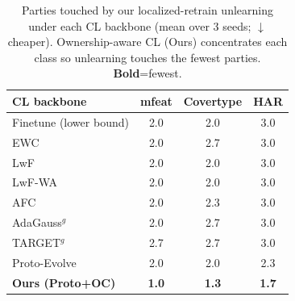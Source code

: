 \begin{table}[t]\centering\small
\caption{Parties touched by our localized-retrain unlearning under each CL backbone (mean over 3 seeds; $\downarrow$ cheaper). Ownership-aware CL (Ours) concentrates each class so unlearning touches the fewest parties. \textbf{Bold}=fewest.}
\begin{tabular}{lccc}\toprule
CL backbone & mfeat & Covertype & HAR \\\midrule
Finetune (lower bound) & 2.0 & 2.0 & 3.0 \\
\midrule
EWC & 2.0 & 2.7 & 3.0 \\
LwF & 2.0 & 2.0 & 3.0 \\
LwF-WA & 2.0 & 2.0 & 3.0 \\
AFC & 2.0 & 2.3 & 3.0 \\
AdaGauss$^{g}$ & 2.0 & 2.7 & 3.0 \\
TARGET$^{g}$ & 2.7 & 2.7 & 3.0 \\
Proto-Evolve & 2.0 & 2.0 & 2.3 \\
\textbf{Ours (Proto+OC)} & \textbf{1.0} & \textbf{1.3} & \textbf{1.7} \\
\bottomrule\end{tabular}\end{table}
